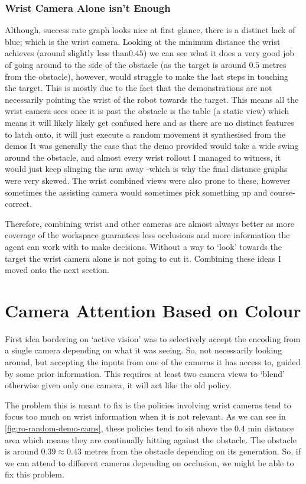 \subsubsection{Wrist Camera Alone isn't Enough}
Although, success rate graph looks nice at first glance, there is a distinct lack of blue; which is the wrist camera. Looking at the minimum distance the wrist achieves (around slightly less than$0.45$) we can see what it does a very good job of going around to the side of the obstacle (as the target is around $0.5$ metres from the obstacle), however, would struggle to make the last steps in touching the target. This is mostly due to the fact that the demonstrations are not necessarily pointing the wrist of the robot towards the target. This means all the wrist camera sees once it is past the obstacle is the table (a static view) which means it will likely likely get confused here and as there are no distinct features to latch onto, it will just execute a random movement it synthesised from the demos It was generally the case that the demo provided would take a wide swing around the obstacle, and almost every wrist rollout I managed to witness, it would just keep slinging the arm away -which is why the final distance graphs were very skewed. The wrist combined views were also prone to these, however sometimes the assisting camera would sometimes pick something up and course-correct.

Therefore, combining wrist and other cameras are almost always better as more coverage of the workspace guarantees less occlusions and more information the agent can work with to make decisions. Without a way to `look' towards the target the wrist camera alone is not going to cut it. Combining these ideas I moved onto the next section.

\section{Camera Attention Based on Colour}\label{sec:reach-obs-naive-cam-attn}
First idea bordering on `active vision' was to selectively accept the encoding from a single camera depending on what it was seeing. So, not necessarily looking around, but accepting the inputs from one of the cameras it has access to, guided by some prior information. This requires at least two camera views to `blend' otherwise given only one camera, it will act like the old policy.

The problem this is meant to fix is the policies involving wrist cameras tend to focus too much on wrist information when it is not relevant. As we can see in \ref{fig:ro-random-demo-cams}, these policies tend to sit above the $0.4$ min distance area which means they are continually hitting against the obstacle. The obstacle is around $0.39 \approx 0.43$ metres from the obstacle depending on its generation. So, if we can attend to different cameras depending on occlusion, we might be able to fix this problem.

